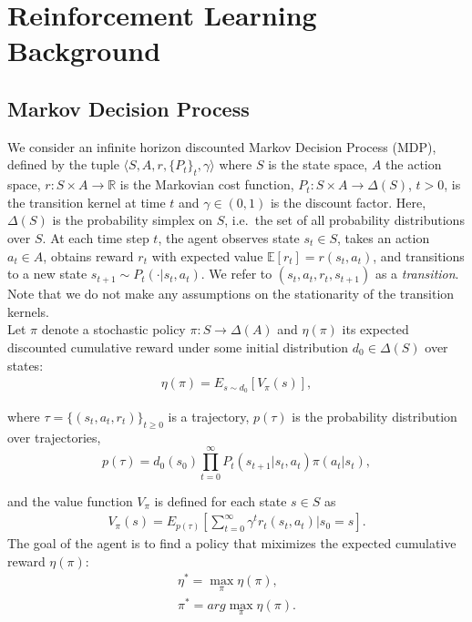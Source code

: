 \documentclass{article}
\begin{document}
\section{Reinforcement Learning Background} \label{sec: RLBackground}

\subsection{ Markov Decision Process}

    We consider an infinite horizon discounted Markov Decision Process (MDP), defined by the tuple $\langle S,A,r,\{P_t\}_t,\gamma \rangle$ where  $S$ is the state space, $A$ the action space, $r:S \times A \rightarrow \mathbb{R}$ is the Markovian cost function, $P_t: S \times A \rightarrow \Delta(S) $, $t>0$, is the transition kernel at time $t$ and $\gamma \in (0, 1) $ is the discount factor. Here, $\Delta(S)$ is the probability simplex on $S$, i.e.~the set of all probability distributions over $S$. At each time step $t$, the agent observes state $s_t \in S$, takes an action $a_t \in A$, obtains reward $r_t$ with expected value $\mathbb{E}[r_t] = r(s_t, a_t)$, and transitions to a new state $s_{t+1} \sim P_t(\cdot \rvert s_t, a_t)$. We refer to $(s_t,a_t,r_t,s_{t+1})$ as a {\em transition}. Note that we do not make any assumptions on the stationarity of the transition kernels.\\ 
    
    Let $\pi$ denote a stochastic policy $\pi : S \rightarrow \Delta(A)$ and $\eta(\pi)$ its expected discounted cumulative reward under some initial distribution $d_0\in\Delta(S)$ over states: %
    \begin{gather}
    \eta(\pi) = E_{s\sim d_0} [V_{\pi}(s)],\label{eqn: expected_cumulative_reward}
    \end{gather}
    
	\noindent
     where $\tau = \{(s_t,a_t, r_t)\}_{t \geq 0}$ is a trajectory, $p(\tau)$ is the probability distribution over trajectories,  %
     \begin{equation}
        p(\tau) = d_0(s_0) \prod_{t=0}^\infty P_t(s_{t+1} \rvert s_t, a_t) \pi(a_t \rvert s_t),
     \end{equation}{}
     
	\noindent
    and the value function $V_\pi$ is defined for each state $s\in S$ as
    \begin{gather}
        V_{\pi}(s) = E_{p(\tau)}[\sum_{t=0}^{\infty} \gamma^t r_t(s_t,a_t) \rvert s_0=s].
    \end{gather}
    The goal of the agent is to find a policy that miximizes the expected cumulative reward $\eta(\pi)$:
    \begin{gather}
    \eta^{*} = \max_{\pi} \eta(\pi),\label{eqn: optimalcost}\\
    \pi^{*} = arg \max_{\pi} \eta(\pi).\label{eqn: optimalpolicy}
    \end{gather}
    
\end{document}
